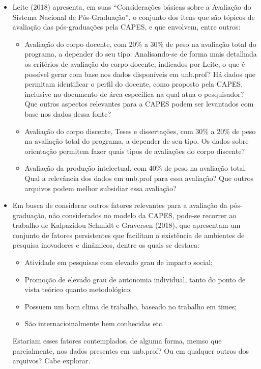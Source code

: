 \documentclass[]{article}
\providecommand{\tightlist}{%
  \setlength{\itemsep}{0pt}\setlength{\parskip}{0pt}}
\begin{document}
\begin{itemize}
\tightlist
\item
  Leite (2018) apresenta, em suas ``Considerações básicas sobre a
  Avaliação do Sistema Nacional de Pós-Graduação'', o conjunto dos itens
  que são tópicos de avaliação das pós-graduações pela CAPES, e que
  envolvem, entre outros:

  \begin{itemize}
  \tightlist
  \item
    Avaliação do corpo docente, com 20\% a 30\% de peso na avaliação
    total do programa, a depender do seu tipo. Analisando-se de forma
    mais detalhada os critérios de avaliação do corpo docente, indicados
    por Leite, o que é possível gerar com base nos dados disponíveis em
    unb.prof? Há dados que permitam identificar o perfil do docente,
    como proposto pela CAPES, inclusive no documento de área específica
    na qual atua o pesquisador? Que outros aspectos relevantes para a
    CAPES podem ser levantados com base nos dados dessa fonte?
  \item
    Avaliação do corpo discente, Teses e dissertações, com 30\% a 20\%
    de peso na avaliação total do programa, a depender de seu tipo. Os
    dados sobre orientação permitem fazer quais tipos de avaliações do
    corpo discente?
  \item
    Avaliação da produção intelectual, com 40\% de peso na avaliação
    total. Qual a relevância dos dados em unb.prof para essa avaliação?
    Que outros arquivos podem melhor subsidiar essa avaliação?
  \end{itemize}
\item
  Em busca de considerar outros fatores relevantes para a avaliação da
  pós-graduação, não considerados no modelo da CAPES, pode-se recorrer
  ao trabalho de Kalpazidou Schmidt e Graversen (2018), que apresentam
  um conjunto de fatores persistentes que facilitam a existência de
  ambientes de pesquisa inovadores e dinâmicos, dentre os quais se
  destaca:

  \begin{itemize}
  \tightlist
  \item
    Atividade em pesquisas com elevado grau de impacto social;
  \item
    Promoção de elevado grau de autonomia individual, tanto do ponto de
    vista teórico quanto metodológico;
  \item
    Possuem um bom clima de trabalho, baseado no trabalho em times;
  \item
    São internacioinalmente bem conhecidas etc.
  \end{itemize}

  Estariam esses fatores contemplados, de alguma forma, memso que
  parcialmente, nos dados presentes em unb.prof? Ou em qualquer outros
  dos arquivos? Cabe explorar.
\end{itemize}
\end{document}
